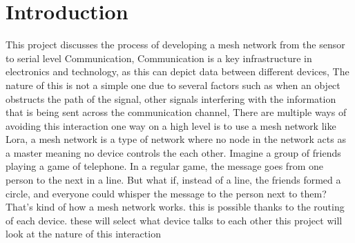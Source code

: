 \section{Introduction}
\label{chpIntro-secIntro}
This project discusses the process of developing a mesh network from the sensor to serial level Communication, Communication is a key infrastructure in electronics and technology, as this can depict data between different devices, The nature of this is not a simple one due to several factors such as when an object obstructs the path of the signal, other signals interfering with the information that is being sent across the communication channel, There are multiple ways of avoiding this interaction one way on a high level is to use a mesh network like Lora, a mesh network is a type of network where no node in the network acts as a master meaning no device controls the each other. Imagine a group of friends playing a game of telephone. In a regular game, the message goes from one person to the next in a line. But what if, instead of a line, the friends formed a circle, and everyone could whisper the message to the person next to them? That's kind of how a mesh network works. this is possible thanks to the routing of each device. these will select what device talks to each other  this project will look at the nature of  this  interaction
